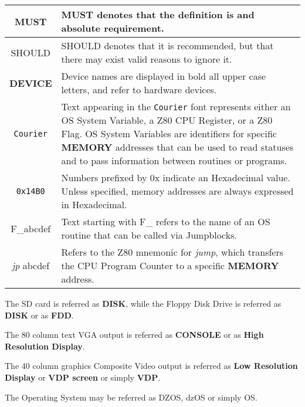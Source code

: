 \documentclass[a4paper,11pt]{article}
\begin{document}
    \begin{center}
        \begin{tabular}{c m{14cm}}
            \hline
            MUST & MUST denotes that the definition is and absolute
            requirement.\\
            \hline
            SHOULD & SHOULD denotes that it is recommended, but that there may
            exist valid reasons to ignore it.\\
            \hline
            \textbf{DEVICE} & Device names are displayed in bold all upper case 
            letters, and refer to hardware devices.\\
            \hline
            \texttt{Courier} & Text appearing in the \texttt{Courier} font 
            represents either an OS System Variable, a Z80 CPU Register,
            or a Z80 Flag. OS System Variables are identifiers for specific
            \textbf{MEMORY} addresses that can be used to read statuses and to
            pass information between routines or programs.\\
            \hline
            \texttt{0x14B0} & Numbers prefixed by 0x indicate an Hexadecimal value.
            Unless specified, memory addresses are always expressed in
            Hexadecimal.\\
            \hline
            F\_abcdef & Text starting with F\_ refers to the name of an OS 
            routine that can be called via Jumpblocks. \\
            \hline
            \textit{jp} abcdef & Refers to the Z80 mnemonic for \textit{jump},
            which transfers the CPU Program Counter to a specific \textbf{MEMORY}
            address.\\
            \hline
        \end{tabular}
    \end{center}

    \hfill\break
    \hfill\break

    The SD card is referred as \textbf{DISK}, while the Floppy Disk Drive is
    referred as \textbf{DISK} or as \textbf{FDD}.

    The 80 column text VGA output is referred as \textbf{CONSOLE} or as
    \textbf{High Resolution Display}.

    The 40 column graphics Composite Video output is referred as \textbf{Low
    Resolution Display} or \textbf{VDP screen} or simply \textbf{VDP}.

    The Operating System may be referred as DZOS, dzOS or simply OS.
\end{document}
